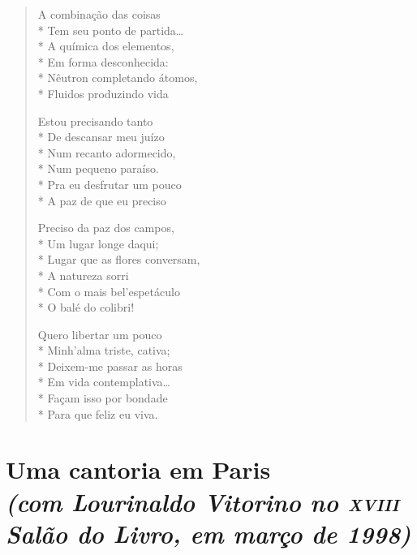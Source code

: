 \begin{verse}
A combinação das coisas\\*
Tem seu ponto de partida\ldots{}\\*
A química dos elementos,\\*
Em forma desconhecida:\\*
Nêutron completando átomos,\\*
Fluidos produzindo vida

Estou precisando tanto\\*
De descansar meu juízo\\*
Num recanto adormecido,\\*
Num pequeno paraíso.\\*
Pra eu desfrutar um pouco\\*
A paz de que eu preciso

Preciso da paz dos campos,\\*
Um lugar longe daqui;\\*
Lugar que as flores conversam,\\*
A natureza sorri\\*
Com o mais bel'espetáculo\\*
O balé do colibri!

Quero libertar um pouco\\*
Minh'alma triste, cativa;\\*
Deixem-me passar as horas\\*
Em vida contemplativa\ldots{}\\*
Façam isso por bondade\\*
Para que feliz eu viva.
\end{verse}


\chapter[Uma cantoria em Paris]{Uma cantoria em Paris\\\smallskip\textit{(com Lourinaldo Vitorino no \textsc{xviii} Salão do Livro, em março de 1998)}}

